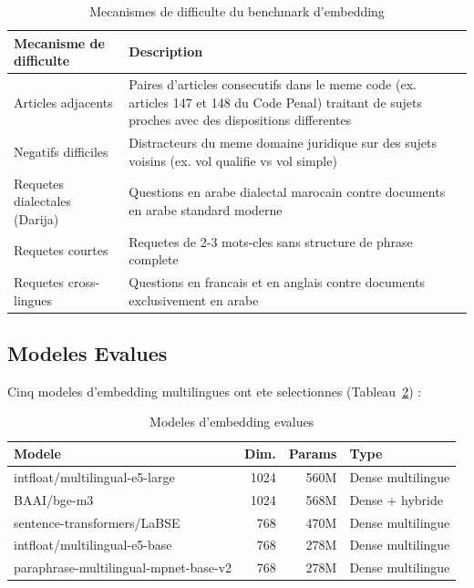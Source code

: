 \begin{table}[h]
\centering
\renewcommand{\arraystretch}{1.3}
\begin{tabular}{|l|p{8cm}|}
\hline
\rowcolor{LightBlue}
\textbf{\color{PrimaryBlue}Mecanisme de difficulte} & \textbf{\color{PrimaryBlue}Description} \\
\hline
Articles adjacents & Paires d'articles consecutifs dans le meme code (ex. articles 147 et 148 du Code Penal) traitant de sujets proches avec des dispositions differentes \\
Negatifs difficiles & Distracteurs du meme domaine juridique sur des sujets voisins (ex. vol qualifie vs vol simple) \\
Requetes dialectales (Darija) & Questions en arabe dialectal marocain contre documents en arabe standard moderne \\
Requetes courtes & Requetes de 2-3 mots-cles sans structure de phrase complete \\
Requetes cross-lingues & Questions en francais et en anglais contre documents exclusivement en arabe \\
\hline
\end{tabular}
\caption{Mecanismes de difficulte du benchmark d'embedding}
\label{tab:embed-difficulty}
\end{table}

\subsection{Modeles Evalues}

Cinq modeles d'embedding multilingues ont ete selectionnes (Tableau~\ref{tab:embed-models}) :

\begin{table}[h]
\centering
\renewcommand{\arraystretch}{1.3}
\begin{tabular}{|l|r|r|l|}
\hline
\rowcolor{LightBlue}
\textbf{\color{PrimaryBlue}Modele} & \textbf{\color{PrimaryBlue}Dim.} & \textbf{\color{PrimaryBlue}Params} & \textbf{\color{PrimaryBlue}Type} \\
\hline
intfloat/multilingual-e5-large & 1024 & 560M & Dense multilingue \\
BAAI/bge-m3 & 1024 & 568M & Dense + hybride \\
sentence-transformers/LaBSE & 768 & 470M & Dense multilingue \\
intfloat/multilingual-e5-base & 768 & 278M & Dense multilingue \\
paraphrase-multilingual-mpnet-base-v2 & 768 & 278M & Dense multilingue \\
\hline
\end{tabular}
\caption{Modeles d'embedding evalues}
\label{tab:embed-models}
\end{table}

